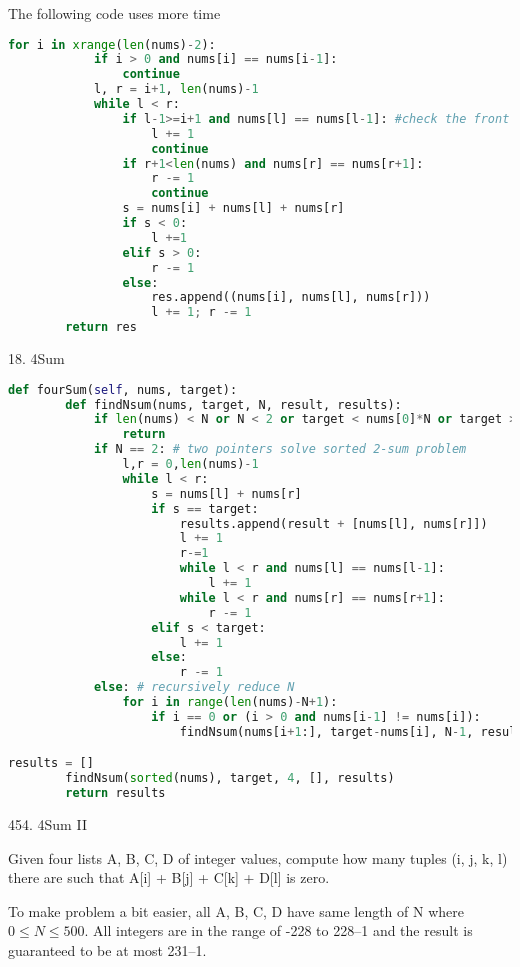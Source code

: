 \documentclass[../../question_3_array_question.tex]{subfiles}
\begin{document}
The following code uses more time
\begin{lstlisting}[language = Python]
for i in xrange(len(nums)-2):
            if i > 0 and nums[i] == nums[i-1]:
                continue
            l, r = i+1, len(nums)-1
            while l < r:
                if l-1>=i+1 and nums[l] == nums[l-1]: #check the front
                    l += 1
                    continue
                if r+1<len(nums) and nums[r] == nums[r+1]:
                    r -= 1
                    continue
                s = nums[i] + nums[l] + nums[r]
                if s < 0:
                    l +=1 
                elif s > 0:
                    r -= 1
                else:
                    res.append((nums[i], nums[l], nums[r]))
                    l += 1; r -= 1
        return res
\end{lstlisting}
18. 4Sum
\begin{lstlisting}[language = Python]
def fourSum(self, nums, target):
        def findNsum(nums, target, N, result, results):
            if len(nums) < N or N < 2 or target < nums[0]*N or target > nums[-1]*N:  # early termination
                return
            if N == 2: # two pointers solve sorted 2-sum problem
                l,r = 0,len(nums)-1
                while l < r:
                    s = nums[l] + nums[r]
                    if s == target:
                        results.append(result + [nums[l], nums[r]])
                        l += 1
                        r-=1
                        while l < r and nums[l] == nums[l-1]:
                            l += 1
                        while l < r and nums[r] == nums[r+1]:
                            r -= 1
                    elif s < target:
                        l += 1
                    else:
                        r -= 1
            else: # recursively reduce N
                for i in range(len(nums)-N+1):
                    if i == 0 or (i > 0 and nums[i-1] != nums[i]):
                        findNsum(nums[i+1:], target-nums[i], N-1, result+[nums[i]], results) #reduce nums size, reduce target, save result

results = []
        findNsum(sorted(nums), target, 4, [], results)
        return results
\end{lstlisting}

454. 4Sum II

Given four lists A, B, C, D of integer values, compute how many tuples (i, j, k, l) there are such that A[i] + B[j] + C[k] + D[l] is zero.

To make problem a bit easier, all A, B, C, D have same length of N where $0 \leq N \leq 500$. All integers are in the range of -228 to 228–1 and the result is guaranteed to be at most 231–1.
\end{document}

